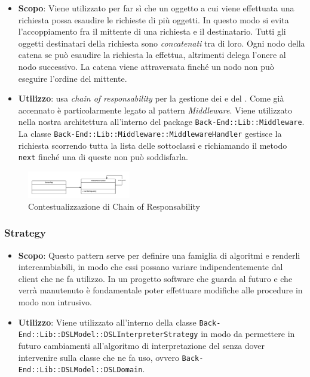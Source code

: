 \begin{itemize}

	\item \textbf{Scopo}: Viene utilizzato per far sì che un oggetto a cui viene effettuata una richiesta possa esaudire le richieste di più oggetti. In questo modo si evita l'accoppiamento fra il mittente di una richiesta e il destinatario. Tutti gli oggetti destinatari della richiesta sono \textit{concatenati} tra di loro. Ogni nodo della catena se può esaudire la richiesta la effettua, altrimenti delega l'onere al nodo successivo. La catena viene attraversata finché un nodo non può eseguire l'ordine del mittente. 
	\item \textbf{Utilizzo}:  usa \textit{chain of responsability} per la gestione dei  e del . Come già accennato è particolarmente legato al pattern \textit{Middleware}. Viene utilizzato nella nostra architettura all'interno del package \texttt{Back-End::Lib::Middleware}. La classe \texttt{Back-End::Lib::Middleware::MiddlewareHandler} gestisce la richiesta scorrendo tutta la lista delle sottoclassi e richiamando il metodo \texttt{next} finché una di queste non può soddisfarla.

\end{itemize}

\begin{figure}[H]
\centering \includegraphics[width=0.4\textwidth]{patterns/contestualizzazione/chain-of-responsability.png}
\caption{Contestualizzazione di Chain of Responsability}
\label{fig:mvc}
\end{figure}

\subsubsection{Strategy}

\begin{itemize}

	\item \textbf{Scopo}: Questo pattern serve per definire una famiglia di algoritmi e renderli intercambiabili, in modo che essi possano variare indipendentemente dal client che ne fa utilizzo. In un progetto software che guarda al futuro e che verrà manutenuto è fondamentale poter effettuare modifiche alle procedure in modo non intrusivo.
	\item \textbf{Utilizzo}: Viene utilizzato all'interno della classe \texttt{Back-End::Lib::DSLModel::DSLInterpreterStrategy} in modo da permettere in futuro cambiamenti all'algoritmo di interpretazione del  senza dover intervenire sulla classe che ne fa uso, ovvero \texttt{Back-End::Lib::DSLModel::DSLDomain}.

\end{itemize}

